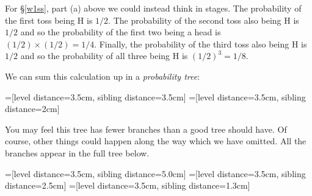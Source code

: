 
For \S\ref{w1ss}, part (a) above we could instead think in stages. The probability of the first toss being H is $1/2$. The probability of the second toss also being H is $1/2$ and so the probability of the first two being a head is $(1/2)\times(1/2) = 1/4$. Finally, the probability of the third toss also being H is $1/2$ and so the probability of all three being H is $(1/2)^3 = 1/8$. 

We can sum this calculation up in a \emph{probability tree}:

=[level distance=3.5cm, sibling distance=3.5cm]
=[level distance=3.5cm, sibling distance=2cm]


You may feel this tree has fewer branches than a good tree should have. Of course, other things could happen along the way which we have omitted. All the branches appear in the full tree below. 

=[level distance=3.5cm, sibling distance=5.0cm]
=[level distance=3.5cm, sibling distance=2.5cm]
=[level distance=3.5cm, sibling distance=1.3cm]


